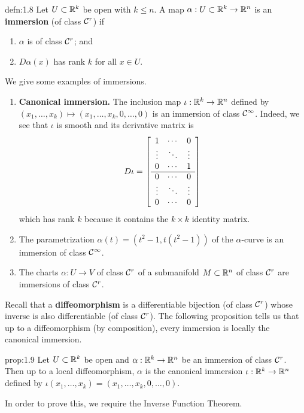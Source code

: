 \begin{defn}{defn:1.8}
    Let $U \subset \mathbb{R}^k$ be open with $k \leq n$. A map $\alpha : U 
    \subset \mathbb{R}^k \to \mathbb{R}^n$ is an {\bf immersion} (of class ${\cal C}^r$) if 
    \begin{enumerate}[(1)]
        \item $\alpha$ is of class ${\cal C}^r$; and 
        \item $D\alpha(x)$ has rank $k$ for all $x \in U$. 
    \end{enumerate}
\end{defn}\vspace{-0.25cm}
We give some examples of immersions. 
\begin{enumerate}[(1)]
    \item {\bf Canonical immersion.} The inclusion map $\iota : \mathbb{R}^k \to \mathbb{R}^n$ defined by 
    $(x_1, \dots, x_k) \mapsto (x_1, \dots, x_k, 0, \dots, 0)$
    is an immersion of class ${\cal C}^\infty$.
    Indeed, we see that $\iota$ is smooth and its derivative matrix is
    \[ D\iota = \mleft[ \begin{array}{ccc}
        1 & \cdots & 0 \\ 
        \vdots & \ddots & \vdots \\ 
        0 & \cdots & 1 \\ \hline 
        0 & \cdots & 0 \\ 
        \vdots & \ddots & \vdots \\ 
        0 & \cdots & 0 \\ 
    \end{array} \mright] \]
    which has rank $k$ because it contains the $k \times k$ identity matrix.

    \item The parametrization $\alpha(t) = (t^2 - 1, t(t^2 - 1))$ of the 
    $\alpha$-curve is an immersion of class ${\cal C}^\infty$. 
    
    \item The charts $\alpha : U \to V$ of class ${\cal C}^r$ of a submanifold 
    $M \subset \mathbb{R}^n$ of class ${\cal C}^r$ are immersions of class ${\cal C}^r$. 
\end{enumerate}
Recall that a {\bf diffeomorphism} is a differentiable bijection 
(of class ${\cal C}^r$) whose inverse is also differentiable (of class ${\cal C}^r$). The 
following proposition tells us that up to a diffeomorphism (by composition), 
every immersion is locally the canonical immersion.

\begin{prop}{prop:1.9}
    Let $U \subset \mathbb{R}^k$ be open and $\alpha : \mathbb{R}^k \to \mathbb{R}^n$ be an immersion 
    of class ${\cal C}^r$. Then up to a local diffeomorphism, $\alpha$ is the 
    canonical immersion $\iota : \mathbb{R}^k \to \mathbb{R}^n$ defined by 
    $\iota(x_1, \dots, x_k) = (x_1, \dots, x_k, 0, \dots, 0)$. 
\end{prop}\vspace{-0.25cm}
In order to prove this, we require the Inverse Function Theorem. 


